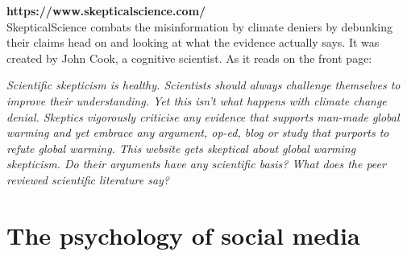\documentclass[11pt]{article}
\begin{document}
\textbf{https://www.skepticalscience.com/}\\
SkepticalScience combats the misinformation by climate deniers by debunking their
claims head on and looking at what the evidence actually says. It was created by
John Cook, a cognitive scientist. As it reads on the front page:

\begin{displayquote}
\textit{Scientific skepticism is healthy. Scientists should always challenge themselves to
improve their understanding. Yet this isn't what happens with climate change denial.
Skeptics vigorously criticise any evidence that supports man-made global warming and
yet embrace any argument, op-ed, blog or study that purports to refute global warming.
This website gets skeptical about global warming skepticism. Do their arguments have
any scientific basis? What does the peer reviewed scientific literature say?}
\end{displayquote}

\section{The psychology of social media}


\pagebreak


\end{document}
